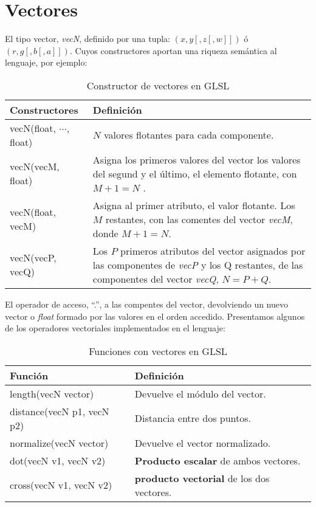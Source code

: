 \section{Vectores}
El tipo vector, \textit{vecN}, definido por una tupla: \((x, y[, z[, w]])\) ó \((r, g[, b[, a]])\). Cuyos constructores aportan una riqueza semántica al lenguaje, por ejemplo:
\begin{table}[H]
    \begin{tabularx}{\textwidth}{l|X}
      \toprule
      Constructores & Definición\\
      \midrule
      vecN(float, \(\cdots\), float) & \(N\) valores flotantes para cada componente.\\
      vecN(vecM, float) & Asigna los primeros valores del vector los valores del segund y el último, el elemento flotante, con \(M+1=N\) . \\
      vecN(float, vecM) & Asigna al primer atributo, el valor flotante. Los \(M\) restantes, con las comentes del vector \textit{vecM}, donde \(M+1=N\). \\
      vecN(vecP, vecQ) & Los \(P\) primeros atributos del vector asignados por las componentes de \textit{vecP} y los Q restantes, de las componentes del vector \textit{vecQ}, \(N = P + Q\). \\
      \bottomrule
    \end{tabularx}
    \caption{Constructor de vectores en GLSL \label{eq:vecN}}
\end{table}
El operador de acceso, \enquote{.}, a las compentes del vector, devolviendo un nuevo vector o \textit{float} formado por las valores en el orden accedido. Presentamos algunos de los operadores vectoriales implementados en el lenguaje:
\begin{table}[H]
    \begin{tabularx}{\textwidth}{l|X}
      \toprule
      Función & Definición\\
      \midrule
      length(vecN vector) & Devuelve el módulo del vector.\\
      distance(vecN p1, vecN p2) & Distancia entre dos puntos. \\
      normalize(vecN vector) & Devuelve el vector normalizado. \\
      dot(vecN v1, vecN v2) & \textbf{Producto escalar} de ambos vectores. \\
      cross(vecN v1, vecN v2) & \textbf{producto vectorial} de los dos vectores. \\
      \bottomrule
    \end{tabularx}
    \caption{Funciones con vectores en GLSL \label{eq:vecopN}}
\end{table}

